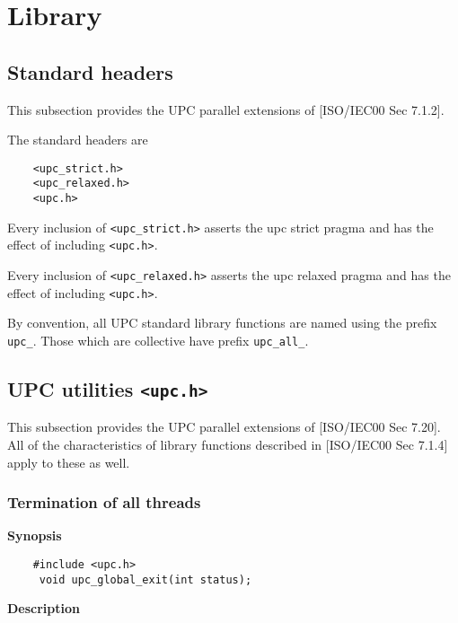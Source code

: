 \pagebreak
\section{Library}
\subsection{Standard headers}

\npf This subsection provides the UPC parallel extensions of
    [ISO/IEC00 Sec 7.1.2].


\np The standard headers are 

\begin{verbatim}
    <upc_strict.h> 
    <upc_relaxed.h>
    <upc.h> 
\end{verbatim}

\np Every inclusion of {\tt <upc\_strict.h>} asserts the upc 
    strict pragma and has the effect of including {\tt <upc.h>}.

\np Every inclusion of {\tt <upc\_relaxed.h>} asserts the upc 
    relaxed pragma and has the effect of including {\tt <upc.h>}.

\np By convention, all UPC standard library functions are  named
    using the prefix {\tt upc\_}.  Those which are collective have
    prefix {\tt upc\_all\_}. 

\pagebreak
\subsection{UPC utilities \tt{<upc.h>}}

\npf This subsection provides the UPC parallel extensions of
    [ISO/IEC00 Sec 7.20].  All of the characteristics of library functions
    described in [ISO/IEC00 Sec 7.1.4] apply to these as well.

\subsubsection{Termination of all threads}
\label{upc_global_exit}

{\bf Synopsis} 

\npf\vspace{-2.5em}
\begin{verbatim}
    #include <upc.h> 
     void upc_global_exit(int status);
\end{verbatim}

{\bf Description}

